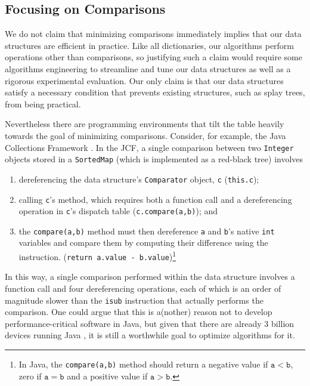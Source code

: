\documentclass{patmorin}
\begin{document}
\subsection{Focusing on Comparisons}

We do not claim that minimizing comparisons immediately implies that our
data structures are efficient in practice. Like all dictionaries, our
algorithms perform operations other than comparisons, so justifying such a
claim would require some algorithms engineering to streamline and tune our
data structures as well as a rigorous experimental evaluation.  Our only
claim is that our data structures satisfy a necessary condition that
prevents existing structures, such as splay trees, from being practical.

Nevertheless there are programming environments that tilt the table
heavily towards the goal of minimizing comparisons.  Consider, for
example, the Java Collections Framework \cite{jcf}.  In the JCF,
a single comparison between two \texttt{Integer} objects stored in a
\texttt{SortedMap} (which is implemented as a red-black tree) involves
\begin{enumerate}
  \item dereferencing the data structure's \texttt{Comparator} object,
    \texttt{c} (\texttt{this.c});
  \item calling \texttt{c}'s  method, which requires
    both a function call and a dereferencing operation in \texttt{c}'s
    dispatch table (\texttt{c.compare(a,b)}); and
  \item the \texttt{compare(a,b)} method must then dereference \texttt{a}
    and \texttt{b}'s native \texttt{int} variables and compare
    them by computing their difference using the 
    instruction. (\texttt{return a.value - b.value})\footnote{In Java,
    the \texttt{compare(a,b)} method should return a negative value if
    $\mathtt{a} < \mathtt{b}$, zero if $\mathtt{a} = \mathtt{b}$ and a
    positive value if $\mathtt{a} > \mathtt{b}$.}
\end{enumerate}
In this way, a single comparison performed within the data structure
involves a function call and four dereferencing operations, each of
which is an order of magnitude slower than the \texttt{isub} instruction
that actually performs the comparison.  One could argue that this
is a(nother) reason not to develop performance-critical software in
Java, but given that there are already 3 billion devices running Java
\cite{www.java.com/en/about}, it is still a worthwhile goal to optimize
algorithms for it.
\end{document}
